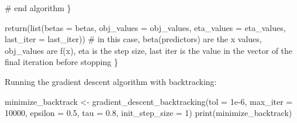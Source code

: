 \documentclass[
  letterpaper,
  DIV=11,
  numbers=noendperiod]{scrartcl}
\newenvironment{Shaded}{\begin{snugshade}}{\end{snugshade}}
\newcommand{\AttributeTok}[1]{\textcolor[rgb]{0.40,0.45,0.13}{#1}}
\newcommand{\CommentTok}[1]{\textcolor[rgb]{0.37,0.37,0.37}{#1}}
\newcommand{\DecValTok}[1]{\textcolor[rgb]{0.68,0.00,0.00}{#1}}
\newcommand{\FloatTok}[1]{\textcolor[rgb]{0.68,0.00,0.00}{#1}}
\newcommand{\FunctionTok}[1]{\textcolor[rgb]{0.28,0.35,0.67}{#1}}
\newcommand{\NormalTok}[1]{\textcolor[rgb]{0.00,0.23,0.31}{#1}}
\newcommand{\OtherTok}[1]{\textcolor[rgb]{0.00,0.23,0.31}{#1}}
\begin{document}
\begin{Shaded}
\begin{Highlighting}[]
    \CommentTok{\# end algorithm}
\NormalTok{  \}}
  
  \FunctionTok{return}\NormalTok{(}\FunctionTok{list}\NormalTok{(}\AttributeTok{betas =}\NormalTok{ betas, }\AttributeTok{obj\_values =}\NormalTok{ obj\_values, }\AttributeTok{eta\_values =}\NormalTok{ eta\_values, }\AttributeTok{last\_iter =}\NormalTok{ last\_iter)) }\CommentTok{\# in this case, beta(predictors) are the x values, obj\_values are f(x), eta is the step size, last iter is the value in the vector of the final iteration before stopping}
\NormalTok{\}}
\end{Highlighting}
\end{Shaded}

Running the gradient descent algorithm with backtracking:

\begin{Shaded}
\begin{Highlighting}[]
\NormalTok{minimize\_backtrack }\OtherTok{\textless{}{-}} \FunctionTok{gradient\_descent\_backtracking}\NormalTok{(}\AttributeTok{tol =} \FloatTok{1e{-}6}\NormalTok{, }\AttributeTok{max\_iter =} \DecValTok{10000}\NormalTok{, }\AttributeTok{epsilon =} \FloatTok{0.5}\NormalTok{, }\AttributeTok{tau =} \FloatTok{0.8}\NormalTok{, }\AttributeTok{init\_step\_size =} \DecValTok{1}\NormalTok{)}
\FunctionTok{print}\NormalTok{(minimize\_backtrack)}
\end{Highlighting}
\end{Shaded}
\end{document}
